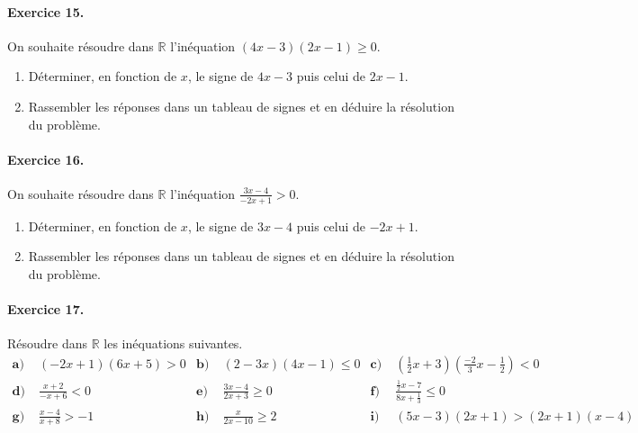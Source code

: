 \documentclass[11pt]{article}
\begin{document}
\paragraph{Exercice 15.} On souhaite résoudre dans $\mathbb{R}$ l'inéquation
$(4x-3)(2x-1)\geq0$.
\begin{enumerate}
  \item Déterminer, en fonction de $x$, le signe de $4x-3$ puis celui de $2x-1$.
  \item Rassembler les réponses dans un tableau de signes et en déduire la
    résolution du problème.
\end{enumerate}

\paragraph{Exercice 16.} On souhaite résoudre dans $\mathbb{R}$ l'inéquation
$\frac{3x-4}{-2x+1}>0$.
\begin{enumerate}
  \item Déterminer, en fonction de $x$, le signe de $3x-4$ puis celui de $-2x+1$.
  \item Rassembler les réponses dans un tableau de signes et en déduire la
    résolution du problème.
\end{enumerate}

\paragraph{Exercice 17.} Résoudre dans $\mathbb{R}$ les inéquations suivantes.
\begin{align*}
  \textbf{a)}\;& (-2x+1)(6x+5)>0 &
  \textbf{b)}\;& (2-3x)(4x-1)\leq0 &
  \textbf{c)}\;&
  \left(\frac{1}{2}x+3\right)\left(\frac{-2}{3}x-\frac{1}{2}\right)<0 \\
  \textbf{d)}\;& \frac{x+2}{-x+6}<0 &
  \textbf{e)}\;& \frac{3x-4}{2x+3} \geq 0 &
  \textbf{f)}\;& \frac{\frac{1}{2}x-7}{8x+\frac{1}{3}} \leq0 \\
  \textbf{g)}\;& \frac{x-4}{x+8} > -1 &
  \textbf{h)}\;& \frac{x}{2x-10}\geq 2 &
  \textbf{i)}\;& (5x-3)(2x+1) > (2x+1)(x-4)
\end{align*}
\end{document}

